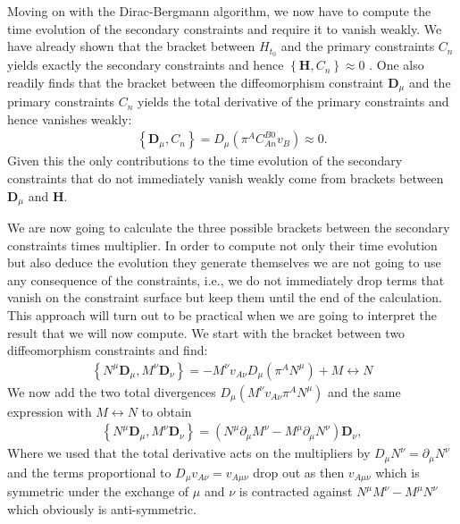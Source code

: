 \documentclass[a4paper,12pt, DIV=14, BCOR=5mm, twoside, headsepline, numbers=noenddot]{scrbook}
\begin{document}
Moving on with the Dirac-Bergmann algorithm, we now have to compute the time evolution of the secondary constraints and require it to vanish weakly. We have already shown that the bracket between $H_{t_0}$ and the primary constraints $C_n$ yields exactly the secondary constraints and hence $\left \{\mathbf{H}, C_n \right \} \approx 0$  . One also readily finds that the bracket between the diffeomorphism constraint $\mathbf{D}_{\mu}$ and the primary constraints $C_n$ yields the total derivative of the primary constraints and hence vanishes weakly:
\begin{align}
    \left \{\mathbf{D}_{\mu}, C_n \right \} = D_{\mu} (\pi^A C_{An}^{B0}v_B) \approx 0.
\end{align}
Given this the only contributions to the time evolution of the secondary constraints that do not immediately vanish weakly come from brackets between $\mathbf{D}_{\mu}$ and $\mathbf{H}$. 

We are now going to calculate the three possible brackets between the secondary constraints times multiplier. In order to compute not only their time evolution but also deduce the evolution they generate themselves we are not going to use any consequence of the constraints, i.e., we do not immediately drop terms that vanish on the constraint surface but keep them until the end of the calculation. This approach will turn out to be practical when we are going to interpret the result that we will now compute. We start with the bracket between two diffeomorphism constraints and find:
\begin{align}
    \left \{ N^{\mu}\mathbf{D}_{\mu}, M^{\nu} \mathbf{D}_\nu \right \} =
    -M^{\nu}v_{A\nu}D_{\mu}(\pi^AN^{\mu}) + M \leftrightarrow N  
\end{align}
We now add the two total divergences $D_{\mu}(M^{\nu}v_{A\nu} \pi^A N^{\mu})$ and the same expression with $M \leftrightarrow N$ to obtain
\begin{align}
    \left \{ N^{\mu}\mathbf{D}_{\mu}, M^{\nu} \mathbf{D}_\nu \right \} = (N^\mu \partial_\mu M^\nu - M^\mu \partial_\mu N^\nu) \mathbf{D}_\nu,
\end{align}
Where we used that the total derivative acts on the multipliers by $D_\mu N^{\nu} = \partial_\mu N^\nu$ and the terms proportional to $D_\mu v_{A\nu} = v_{A\mu \nu}$ drop out as then $v_{A\mu \nu}$ which is symmetric under the exchange of $\mu$ and $\nu$ is contracted against $N^\mu M^\nu - M^\mu N^\nu$ which obviously is anti-symmetric. 
\end{document}
